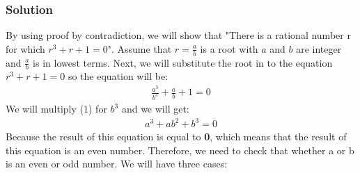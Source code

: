 \documentclass{article}
\begin{document}
\subsubsection*{Solution}
By using proof by contradiction, we will show that "There is a rational number r for which $r^3 + r + 1 = 0$". Assume that $r = \frac{a}{b}$ is a root with $a$ and $b$ are integer and $\frac{a}{b}$ is in lowest terms. Next, we will substitute the root in to the equation $r^3 + r + 1 = 0$ so the equation will be:
\begin{align}
    \frac{a^3}{b^3} + \frac{a}{b} + 1 = 0
\end{align}
We will multiply (1) for $b^3$ and we will get:
\begin{align}
    a^3 + ab^2 + b^3 = 0
\end{align}
Because the result of this equation is equal to \textbf{0}, which means that the result of this equation is an even number. Therefore, we need to check that whether a or b is an even or odd number. We will have three cases:
\end{document}

